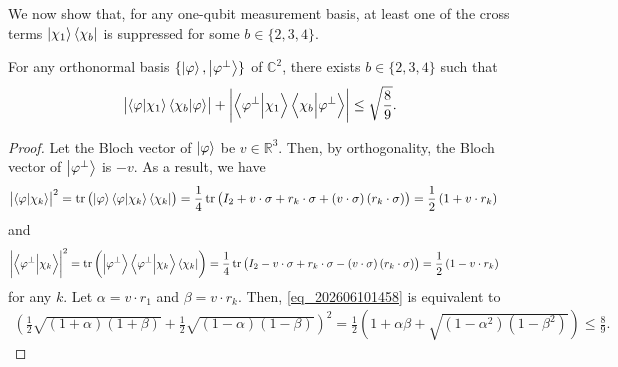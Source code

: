 We now show that, for any one-qubit measurement basis, at least one of the cross terms $\ket{\chi_1}\bra{\chi_b}$ is suppressed for some $b\in\{2,3,4\}$.
\begin{lemma}
For any orthonormal basis $\{\ket{\varphi},\ket{\varphi^\perp}\}$ of $\mathbb{C}^2$, there exists $b\in\{2,3,4\}$ such that
\begin{align}\label{eq_202606101458}
\left|\bra{\varphi}\ket{\chi_1}\bra{\chi_b}\ket{\varphi}\right|+\left|\bra{\varphi^\perp}\ket{\chi_1}\bra{\chi_b}\ket{\varphi^\perp}\right|\le\sqrt{\frac{8}{9}}.
\end{align}
\end{lemma}
\begin{proof}
Let the Bloch vector of $\ket{\varphi}$ be $v\in\mathbb{R}^3$.
Then, by orthogonality, the Bloch vector of $\ket{\varphi^\perp}$ is $-v$.
As a result, we have
\begin{align*}
\left|\bra{\varphi}\ket{\chi_k}\right|^2&=\tr\left(\ket{\varphi}\bra{\varphi}\ket{\chi_k}\bra{\chi_k}\right)=\frac{1}{4}\tr\left(I_2+v\cdot\sigma+r_k\cdot\sigma+\left(v\cdot\sigma\right)\left(r_k\cdot\sigma\right)\right)=\frac{1}{2}\left(1+v\cdot r_k\right)
\end{align*}
and
\begin{align*}
\left|\bra{\varphi^\perp}\ket{\chi_k}\right|^2&=\tr\left(\ket{\varphi^\perp}\bra{\varphi^\perp}\ket{\chi_k}\bra{\chi_k}\right)=\frac{1}{4}\tr\left(I_2-v\cdot\sigma+r_k\cdot\sigma-\left(v\cdot\sigma\right)\left(r_k\cdot\sigma\right)\right)=\frac{1}{2}\left(1-v\cdot r_k\right)
\end{align*}
for any $k$.
Let $\alpha=v\cdot r_1$ and $\beta=v\cdot r_k$.
Then, \eqref{eq_202606101458} is equivalent to
\begin{align*}
\left(\frac{1}{2}\sqrt{(1+\alpha)(1+\beta)}+\frac{1}{2}\sqrt{(1-\alpha)(1-\beta)}\right)^2=\frac{1}{2}\left(1+\alpha\beta+\sqrt{\left(1-\alpha^2\right)\left(1-\beta^2\right)}\right)\le\frac{8}{9}.
\end{align*}


\end{proof}
